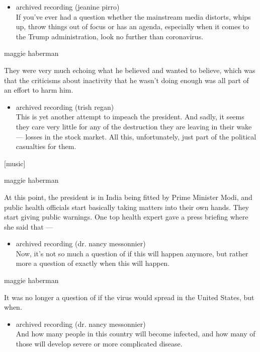 \begin{itemize}
\tightlist
\item
  archived recording (jeanine pirro)\\
  If you've ever had a question whether the mainstream media distorts,
  whips up, throw things out of focus or has an agenda, especially when
  it comes to the Trump administration, look no further than
  coronavirus.
\end{itemize}

maggie haberman

They were very much echoing what he believed and wanted to believe,
which was that the criticisms about inactivity that he wasn't doing
enough was all part of an effort to harm him.

\begin{itemize}
\tightlist
\item
  archived recording (trish regan)\\
  This is yet another attempt to impeach the president. And sadly, it
  seems they care very little for any of the destruction they are
  leaving in their wake --- losses in the stock market. All this,
  unfortunately, just part of the political casualties for them.
\end{itemize}

{[}music{]}

maggie haberman

At this point, the president is in India being fitted by Prime Minister
Modi, and public health officials start basically taking matters into
their own hands. They start giving public warnings. One top health
expert gave a press briefing where she said that ---

\begin{itemize}
\tightlist
\item
  archived recording (dr. nancy messonnier)\\
  Now, it's not so much a question of if this will happen anymore, but
  rather more a question of exactly when this will happen.
\end{itemize}

maggie haberman

It was no longer a question of if the virus would spread in the United
States, but when.

\begin{itemize}
\tightlist
\item
  archived recording (dr. nancy messonnier)\\
  And how many people in this country will become infected, and how many
  of those will develop severe or more complicated disease.
\end{itemize}

